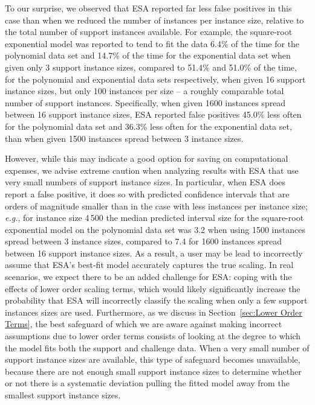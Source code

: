 \documentclass[aic]{iosart2x}
\newcommand{\eg}{\emph{e.g.}}
\begin{document}
To our surprise, we observed that ESA reported far less false positives in this case than when we reduced the number of instances per instance size, relative to the total number of support instances available. 
For example, the square-root exponential model was reported to tend to fit the data 6.4\% of the time for the polynomial data set and 14.7\% of the time for the exponential data set when given only 3 support instance sizes, compared to 51.4\% and 51.0\% of the time, for the polynomial and exponential data sets respectively, when given 16 support instance sizes, but only 100 instances per size -- a roughly comparable total number of support instances.
Specifically, when given 1600 instances spread between 16 support instance sizes, ESA reported false positives 45.0\% less often for the polynomial data set and 36.3\% less often for the exponential data set, than when given 1500 instances spread between 3 instance sizes. 

However, while this may indicate a good option for saving on computational expenses, we advise extreme caution when analyzing results with ESA that use very small numbers of support instance sizes. 
In particular, when ESA does report a false positive, it does so with predicted confidence intervals that are orders of magnitude smaller than in the case with less instances per instance size; \eg{}, for instance size 4\,500 the median predicted interval size for the square-root exponential model on the polynomial data set was 3.2 when using 1500 instances spread between 3 instance sizes, compared to 7.4 for 1600 instances spread between 16 support instance sizes. 
As a result, a user may be lead to incorrectly assume that ESA's best-fit model accurately captures the true scaling. 
In real scenarios, we expect there to be an added challenge for ESA: coping with the effects of lower order scaling terms, which would likely significantly increase the probability that ESA will incorrectly classify the scaling when only a few support instances sizes are used. 
Furthermore, as we discuss in Section~\ref{sec:Lower Order Terms}, the best safeguard of which we are aware against making incorrect assumptions due to lower order terms consists of looking at the degree to which the model fits both the support and challenge data. When a very small number of support instance sizes are available, this type of safeguard becomes unavailable, because there are not enough small support instance sizes to determine whether or not there is a systematic deviation pulling the fitted model away from the smallest support instance sizes.
\end{document}

